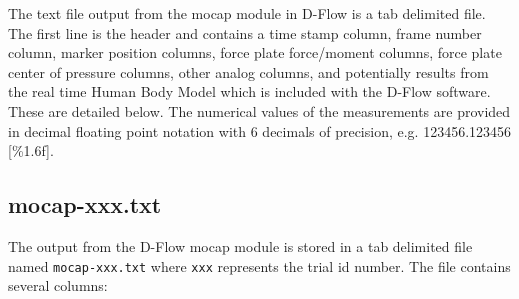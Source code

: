 \documentclass[fleqn,10pt]{wlpeerj}
\begin{document}
The text file output from the mocap module in D-Flow is a tab delimited file.
The first line is the header and contains a time stamp column, frame number
column, marker position columns, force plate force/moment columns, force plate
center of pressure columns, other analog columns, and potentially results from
the real time Human Body Model \cite{Bogert2013} which is included with the
D-Flow software. These are detailed below. The numerical values of the
measurements are provided in decimal floating point notation with 6 decimals of
precision, e.g. 123456.123456 [\%1.6f].

\subsection*{mocap-xxx.txt}

The output from the D-Flow mocap module is stored in a tab delimited file named
\verb+mocap-xxx.txt+ where \verb+xxx+ represents the trial id number. The file
contains several columns:
\end{document}
